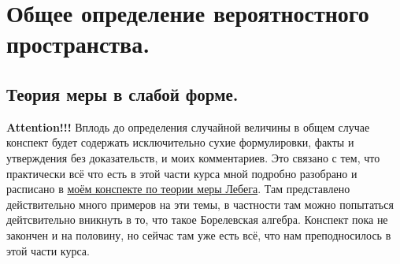 \usetikzlibrary{arrows}


\section{Общее определение вероятностного пространства.}

\subsection{Теория меры в слабой форме.}
\textbf{Attention!!!} Вплодь до определения случайной величины в общем случае конспект будет содержать исключительно
сухие формулировки, факты и утверждения без доказательств, и моих комментариев. Это связано с тем, что практически всё что есть
в этой части курса мной подробно разобрано и расписано в \href{https://raw.githubusercontent.com/johanDDC/My_TeXs/5981fbe92fbd8dfae37ea2c29fbf204a942d0d09/pdf/Lebeg/Lebeg.pdf}{моём конспекте по теории меры Лебега}.
Там представлено действительно много примеров на эти темы, в частности там можно попытаться дейтсвительно вникнуть в то,
что такое Борелевская алгебра. Конспект пока не закончен и на половину, но сейчас там уже есть всё, что нам
преподносилось в этой части курса.

